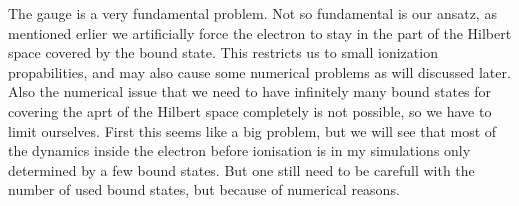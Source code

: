 



The gauge is a very fundamental problem. Not so fundamental is our ansatz, as mentioned erlier we artificially force the electron to stay in the part of the Hilbert space covered by the bound state.
This restricts us to small ionization propabilities, and may also cause some numerical problems as will discussed later.\\ %
Also the numerical issue that we need to have infinitely many bound states for covering the aprt of the Hilbert space completely is not possible, so we have to limit ourselves.
First this seems like a big problem, but we will see that most of the dynamics inside the electron before ionisation is in my simulations only determined by a few bound states.
But one still need to be carefull with the number of used bound states, but because of numerical reasons.\\\\

